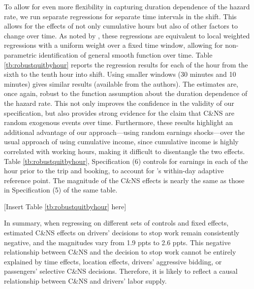 \documentclass[reviewmode]{restat}
\begin{document}
To allow for even more flexibility in capturing duration dependence of the hazard rate, we run separate 
regressions for separate time intervals in the shift. This allows for the effects of not only cumulative 
hours but also of other factors to change over time. As noted by \cite{thakral2018daily}, these regressions 
are equivalent to local weighted regressions \citep{cleveland1988locally} with a uniform weight over a fixed
time window, allowing for non-parametric identification of general smooth function over time.  
Table \ref{tb:robustquitbyhour} reports the regression results for each of the hour from the sixth to the
tenth hour into shift. Using smaller windows (30 minutes and 10 minutes) gives similar results (available 
from the authors). The estimates are, once again, robust to the function assumption about the duration
dependence of the hazard rate. This not only improves the confidence in the validity of our specification,
but also provides strong evidence for the claim that C\&NS are random exogenous events over time. 
Furthermore, these results highlight an additional advantage of our approach---using random earnings 
shocks---over the usual approach of using cumulative income, since cumulative income is highly correlated
with working hours, making it difficult to disentangle the two effects.  Table \ref{tb:robustquitbyhour}, 
Specification (6) controls for earnings in each of the hour prior to the trip and booking, to account for \cite{thakral2018daily}'s within-day adaptive reference point. The magnitude of the C\&NS effects is nearly 
the same as those in Specification (5) of the same table.


\begin{center}
	[Insert Table \ref{tb:robustquitbyhour} here]
\end{center}


In summary, when regressing on different sets of controls and fixed effects, estimated C\&NS effects on
drivers' decisions to stop work remain consistently negative, and the magnitudes vary
from 1.9 ppts to 2.6 ppts. This negative relationship between C\&NS and the decision to stop work cannot
be entirely explained by time effects, location effects, drivers' aggressive bidding, or passengers' 
selective C\&NS decisions. Therefore, it is likely to reflect a causal relationship between C\&NS and 
drivers' labor supply.
\end{document}
